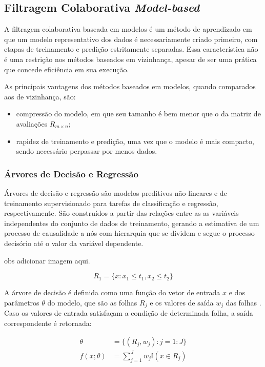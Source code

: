 \subsection{Filtragem Colaborativa \textit{Model-based}}
A filtragem colaborativa baseada em modelos é um método de aprendizado em que um
modelo representativo dos dados é necessariamente criado primeiro, com etapas de
treinamento e predição estritamente separadas. Essa característica  não é uma
restrição nos métodos baseados em vizinhança, apesar de ser uma prática que
concede eficiência em sua execução.

As principais vantagens dos métodos baseados em modelos, quando comparados aos de vizinhança, são:
\begin{itemize}
    \item compressão do modelo, em que seu tamanho é bem menor que o da matriz de avaliações $R_{m \times n}$;
    \item rapidez de treinamento e predição, uma vez que o modelo é mais compacto, sendo necessário perpassar por menos dados.
\end{itemize}
\subsubsection{Árvores de Decisão e Regressão}
Árvores de decisão e regressão são modelos preditivos não-lineares e de
treinamento supervisionado para tarefas de classificação e regressão,
respectivamente. São construídos a partir das relações entre as as variáveis
independentes do conjunto de dados de treinamento, gerando a estimativa de um
processo de causalidade a nós com hierarquia que se dividem e segue o processo
decisório até o valor da variável dependente.

obs adicionar imagem aqui.

\begin{equation}
    R_1 =\{x:x_1 \leqslant  t_1,x_2 \leqslant t_2\}
\end{equation}

A árvore de decisão é definida como uma função do vetor de entrada $x$ e dos
parâmetros $\theta$ do modelo, que são as folhas $R_j$ e os valores de saída
$w_j$ das folhas \cite{pml1Book}. Caso os valores de entrada satisfaçam a
condição de determinada folha, a saída correspondente é retornada:

\begin{align}
    \theta &= \{(R_j, w_j) : j = 1 : J \} \\
    f(x;\theta) &= \sum_{j=1}^{J} w_j \mathbb{I} (x \in R_j)
\end{align}

